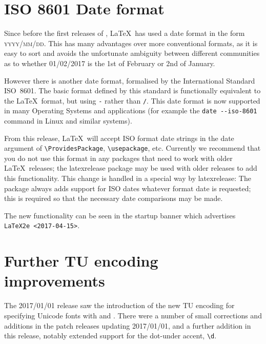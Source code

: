 \documentclass{ltnews}
\begin{document}
\maketitle
\tableofcontents

\setlength{}

\section{ISO 8601 Date format}
Since before the first releases of \LaTeXe, \LaTeX\ has used a date
format in the form \textsc{yyyy/mm/dd}. This has many advantages over more
conventional formats, as it is easy to sort and avoids the unfortunate
ambiguity between different communities as to whether 01/02/2017 is the
1st of February or 2nd of January.

However there is another date format, formalised by the
International Standard ISO~8601. The basic format defined by this
standard is functionally equivalent to the \LaTeX\ format, but using
\texttt{-} rather than \texttt{/}. This date format is now supported
in many Operating Systems and applications
(for example the \verb|date --iso-8601| command in Linux and similar systems).

From this release, \LaTeX\ will accept ISO format date strings in the
date argument of \verb|\ProvidesPackage|, \verb|\usepackage|, etc.
Currently we recommend that you do not use this format in any packages
that need to work with older \LaTeX\ releases;
the \textsf{latexrelease} package may be used with older releases to
 add this functionality. This change is handled in a special way  by
 \textsf{latexrelease}: The package always adds support for ISO dates
whatever format date is requested; this is required so that the
necessary date comparisons may be made.

The new functionality can be seen in the startup banner which
advertises \texttt{LaTeX2e <2017-04-15>}.

\section{Further TU encoding improvements}
The 2017/01/01 release saw the introduction of the new TU encoding for
specifying Unicode fonts with  and
. There were a number of small corrections and additions
in the patch releases updating 2017/01/01, and a further addition in
this release, notably extended support for the dot-under accent,
\verb|\d|.
\end{document}
